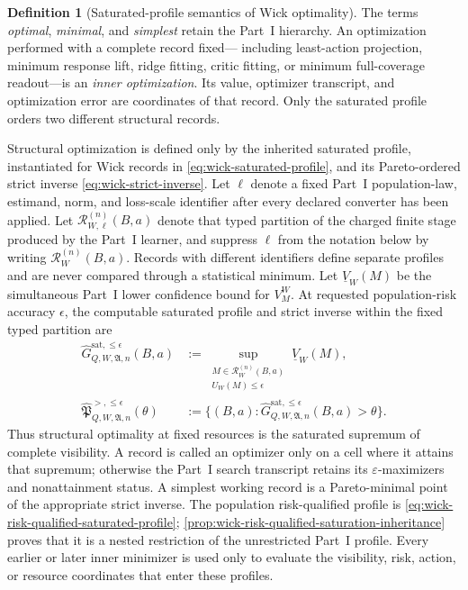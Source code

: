 \documentclass[11pt]{article}
\numberwithin{section}{part}
\theoremstyle{plain}
\theoremstyle{definition}
\newtheorem{definition}[definition]{Definition}
\theoremstyle{remark}
\begin{document}
\begin{definition}[Saturated-profile semantics of Wick optimality]
\label{def:wick-saturated-optimality}
The terms \emph{optimal}, \emph{minimal}, and \emph{simplest} retain the
Part~I hierarchy.  An optimization performed with a complete record fixed---
including least-action projection, minimum response lift, ridge fitting,
critic fitting, or minimum full-coverage readout---is an \emph{inner
optimization}.  Its value, optimizer transcript, and optimization error are
coordinates of that record.  Only the saturated profile orders two different
structural records.

Structural optimization is defined only by the inherited saturated profile,
instantiated for Wick records in \eqref{eq:wick-saturated-profile}, and its
Pareto-ordered strict inverse \eqref{eq:wick-strict-inverse}.  Let
\(\ell\) denote a fixed Part~I population-law, estimand, norm, and loss-scale
identifier after every declared converter has been applied.  Let
\(\mathscr R_{W,\ell}^{(n)}(B,a)\) denote that typed partition of the charged
finite stage produced by the Part~I learner, and suppress \(\ell\) from the
notation below by writing \(\mathscr R_W^{(n)}(B,a)\).  Records with different
identifiers define separate profiles and are never compared through a
statistical minimum.  Let \(\underline V_W(M)\) be the simultaneous Part~I
lower confidence bound for \(V_M^W\).  At requested population-risk accuracy
\(\epsilon\), the computable saturated profile and strict inverse within the
fixed typed partition are
\begin{align}
 \label{eq:wick-certified-risk-profile}
 \widehat G_{Q,W,\mathfrak A,n}^{\mathrm{sat},\le\epsilon}(B,a)
 &:=\sup_{\substack{M\in\mathscr R_W^{(n)}(B,a)\\
                    U_W(M)\le\epsilon}}
       \underline V_W(M),\\
 \label{eq:wick-certified-risk-inverse}
 \widehat{\mathfrak P}_{Q,W,\mathfrak A,n}^{>,\le\epsilon}(\theta)
 &:=\{(B,a):
 \widehat G_{Q,W,\mathfrak A,n}^{\mathrm{sat},\le\epsilon}(B,a)>\theta\}.
\end{align}
Thus structural optimality at fixed resources is the saturated supremum of
complete visibility.  A record is called an optimizer only on a cell where it
attains that supremum; otherwise the Part~I search transcript retains its
\(\varepsilon\)-maximizers and nonattainment status.  A simplest working
record is a Pareto-minimal point of the appropriate strict inverse.  The
population risk-qualified profile is
\eqref{eq:wick-risk-qualified-saturated-profile};
\cref{prop:wick-risk-qualified-saturation-inheritance} proves that it is a
nested restriction of the unrestricted Part~I profile.  Every earlier or later
inner minimizer is used only to evaluate the visibility, risk, action, or
resource coordinates that enter these profiles.
\end{definition}
\end{document}
